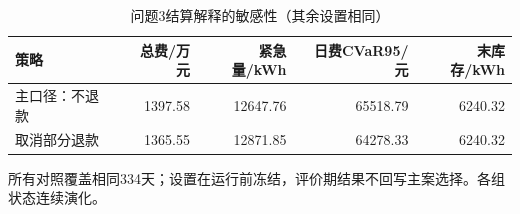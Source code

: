 \begin{table}[htbp]\centering\small
\caption{问题3结算解释的敏感性（其余设置相同）}
\label{tab:v2_settlement}
\begin{tabularx}{\linewidth}{LRRRR}\toprule
策略 & 总费/万元 & 紧急量/kWh & 日费CVaR95/元 & 末库存/kWh\\\midrule
主口径：不退款 & 1397.58 & 12647.76 & 65518.79 & 6240.32\\
取消部分退款 & 1365.55 & 12871.85 & 64278.33 & 6240.32\\
\bottomrule\end{tabularx}
\par\smallskip\parbox{\linewidth}{\footnotesize 所有对照覆盖相同334天；设置在运行前冻结，评价期结果不回写主案选择。各组状态连续演化。}
\end{table}